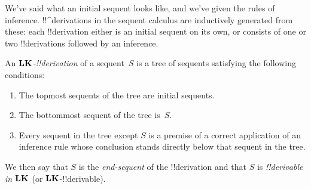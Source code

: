 \documentclass[../../../include/open-logic-section]{subfiles}
\begin{document}


\begin{explain}
We've said what an initial sequent looks like, and we've given the
rules of inference.  !!^{derivation}s in the sequent calculus are
inductively generated from these: each !!{derivation} either is an
initial sequent on its own, or consists of one or two !!{derivation}s
followed by an inference.
\end{explain}

\begin{defn}
An \emph{$\mathbf{LK}$-!!{derivation}} of a sequent~$S$ is a tree of
sequents satisfying the following conditions:
\begin{enumerate}
\item The topmost sequents of the tree are initial sequents.
\item The bottommost sequent of the tree is~$S$.
\item Every sequent in the tree except $S$ is a premise of a correct
  application of an inference rule whose conclusion stands directly
  below that sequent in the tree.
\end{enumerate}
We then say that $S$ is the \emph{end-sequent} of the !!{derivation} and
that $S$ is \emph{!!{derivable} in $\mathbf{LK}$} (or $\mathbf{LK}$-!!{derivable}).
\end{defn}
\end{document}

